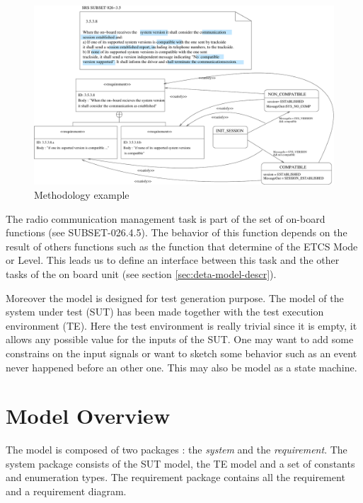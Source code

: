 \documentclass{openetcs_article}
\begin{document}
\begin{figure}[htbp]
\centering
\includegraphics[width=\textwidth]{methodo_example}
\caption{\label{fig:methodo-ex} Methodology example}
\end{figure}

The radio communication management task is part of the set of on-board functions
(see SUBSET-026.4.5). The behavior of this function depends on the result of
others functions such as the function that determine of the ETCS Mode or Level.
This leads us to define an interface between this task
and the other tasks of the on board unit (see section \ref{sec:deta-model-descr}).

Moreover the model is designed for test generation purpose. The model of the
system under test (SUT)  has been
made together with the test execution environment (TE). Here the test
environment is really trivial since it is empty, it allows any possible value
for the inputs of the SUT. One may want to add some constrains on the input
signals or want to sketch some behavior such as an event never happened before
an other one. This may also be model as a state machine.

\section{Model Overview}
\label{sec:model-overview}
The model is composed of two packages : the \emph{system} and the
\emph{requirement}. The system package consists of the SUT model, the TE
model and a set of constants and enumeration types. The
requirement package contains all the requirement and a requirement diagram.

\end{document}
